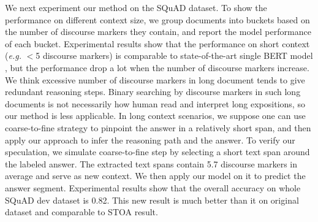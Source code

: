  We next experiment our method on the SQuAD dataset. To show the performance on different context size, we group documents into buckets based on the number of discourse markers they contain, and report the model performance of each bucket. Experimental results show that the performance on short context (\emph{e.g.} $<$5 discourse markers) is comparable to state-of-the-art single BERT model \cite{DBLP:journals/corr/abs-1810-04805}, but the performance drop a lot when the number of discourse markers increase. We think excessive number of discourse markers in long document tends to give redundant reasoning steps. Binary searching by discourse markers in such long documents is not necessarily how human read and interpret long expositions, so our method is less applicable. In long context scenarios, we suppose one can use coarse-to-fine strategy to pinpoint the answer in a relatively short span, and then apply our approach to infer the reasoning path and the answer. To verify our speculation, we simulate coarse-to-fine step by selecting a short text span around the labeled answer. The extracted text spans contain 5.7 discourse markers in average and serve as new context. We then apply our model on it to predict the answer segment. Experimental results show that the overall accuracy on whole SQuAD dev dataset is 0.82. This new result is much better than it on original dataset and comparable to STOA result. 